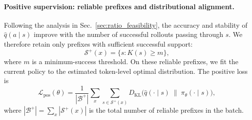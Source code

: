 \documentclass{article}
\begin{document}
\paragraph{Positive supervision: reliable prefixes and distributional alignment.}
Following the analysis in Sec.~\ref{sec:ratio_feasibility}, the accuracy and
stability of $\widehat q(a\mid s)$ improve with the number of successful rollouts
passing through $s$.  We therefore retain only prefixes with sufficient successful
support:
\begin{equation}
\mathcal{S}^{+}(x)=\bigl\{s:K(s)\ge m\bigr\},
\label{eq:reliable_prefixes}
\end{equation}
where $m$ is a minimum-success threshold.
On these reliable prefixes, we fit the current policy to the estimated
token-level optimal distribution. The positive loss is
\begin{equation}
\mathcal{L}_{\mathrm{pos}}(\theta)
=
\frac{1}{|\mathcal{B}^{+}|}
\sum_{x}\sum_{s\in\mathcal{S}^{+}(x)}
D_{\mathrm{KL}}\!\bigl(\widehat q(\cdot\mid s)\;\big\|\;\pi_\theta(\cdot\mid s)\bigr),
\label{eq:positive_loss}
\end{equation}
where $|\mathcal{B}^{+}|=\sum_{x}|\mathcal{S}^{+}(x)|$ is the total number of
reliable prefixes in the batch.
\end{document}
